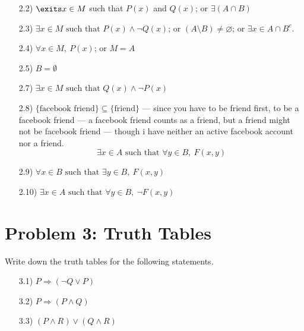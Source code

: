 \begin{enumerate}
    \item[2.2)] $\exits x \in M$ such that $P(x)$ and $Q(x)$; or $\exists(A \cap B)$
    \item[2.3)] $\exists x \in M \text{ such that } P(x) \land \neg Q(x)$; or $(A \setminus B) \neq \varnothing$; or $\exists x \in A \cap B^{c}$.
    \item[2.4)] $\forall x \in M,\ P(x)$; or $M = A$
    \item[2.5)] $B = \emptyset$
    \item[2.7)] $\exists x \in M \text{ such that } Q(x) \land \neg P(x)$
    \item[2.8)] $\{\text{facebook friend}\} \subseteq \{\text{friend}\}$ --- since you have to be friend first, to be a facebook friend --- a facebook friend counts as a friend, but a friend might not be facebook friend --- though i have neither an active facebook account nor a friend.
        \[\boxed{\exists x \in A \text{ such that } \forall y \in B,\ F(x, y)}\]
    \item[2.9)] $\forall x \in B \text{ such that } \exists y \in B,\ F(x, y)$
    \item[2.10)] $\exists x \in A \text{ such that } \forall y \in B,\ \neg F(x, y)$
\end{enumerate}

\vspace{1em}
\hrulefill

\section*{Problem 3: Truth Tables}
Write down the truth tables for the following statements.
\begin{enumerate}
    \item[3.1)] $P \Rightarrow (\neg Q \lor P)$
    \item[3.2)] $P \Rightarrow (P \land Q)$
    \item[3.3)] $(P \land R) \lor (Q \land R)$
\end{enumerate}

\medskip
\solution

